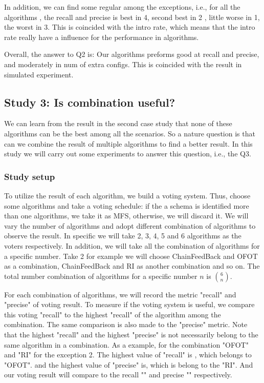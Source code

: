 \documentclass[10pt,journal,cspaper,compsoc]{IEEEtran}
\begin{document}
 In addition, we can find some regular among the exceptions, i.e., for all the algorithms , the recall and precise is best in 4, second best in 2 , little worse in 1, the worst in 3. This is coincided with the intro rate, which means that the intro rate really have a influence for the performance in algorithms.

 Overall, the answer to Q2 is: Our algorithms preforms good at recall and precise, and moderately in num of extra configs. This is coincided with the result in simulated experiment.

 \subsection{Study 3: Is combination useful?}
 We can learn from the result in the second case study that none of these algorithms can be the best among all the scenarios. So a nature question is that can we combine the result of multiple algorithms to find a better result. In this study we will carry out some experiments to answer this question, i.e., the Q3.
 \subsubsection{Study setup}
 To utilize the result of each algorithm, we build a voting system. Thus, choose some algorithms and take a voting schedule: if the a schema is identified more than one algorithms, we take it as MFS, otherwise, we will discard it. We will vary the number of algorithms and adopt different combination of algorithms to observe the result. In specific we will take 2, 3, 4, 5 and 6 algorithms as the voters respectively. In addition, we will take all the combination of algorithms for a specific number. Take 2 for example we will choose ChainFeedBack and OFOT as a combination, ChainFeedBack and RI as another combination and so on. The total number combination of algorithms for a specific number $n$ is $\binom{6}{n}$.

 For each combination of algorithms, we will record the metric "recall" and "precise" of voting result. To measure if the voting system is useful, we compare this voting "recall" to the highest "recall" of the algorithm among the combination. The same comparison is also made to the "precise" metric. Note that the highest "recall" and the highest "precise" is not necessarily belong to the same algorithm in a combination. As a example, for the combination "OFOT" and "RI" for the exception 2. The highest value of "recall" is , which belongs to "OFOT". and the highest value of "precise" is, which is belong to the "RI".  And our voting result will compare to the recall "" and precise "" respectively.
\end{document}
